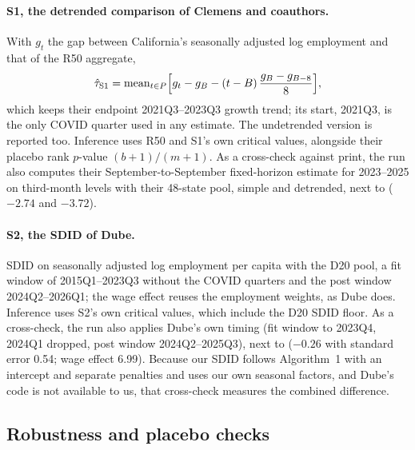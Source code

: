 \paragraph{S1, the detrended comparison of Clemens and coauthors.} With
$g_t$ the gap between California's seasonally adjusted log employment and that of the R50
aggregate,
\begin{equation}
\hat\tau_{\mathrm{S1}} = \operatorname{mean}_{t\in P}\Bigl[g_t - g_B - (t-B)\,\frac{g_B - g_{B-8}}{8}\Bigr],
\end{equation}
which keeps their endpoint 2021Q3--2023Q3 growth trend; its start, 2021Q3, is the only COVID
quarter used in any estimate. The undetrended version is reported too. Inference uses R50 and S1's
own critical values, alongside their placebo rank $p$-value $(b+1)/(m+1)$. As a cross-check against
print, the run also computes their September-to-September fixed-horizon estimate for 2023--2025
on third-month levels with their 48-state pool, simple and detrended, next to
\citet[Table~3, Panel~B]{clemens2026employment} ($-2.74$ and $-3.72$).

\paragraph{S2, the SDID of Dube.} SDID on seasonally adjusted log employment per capita with the D20
pool, a fit window of 2015Q1--2023Q3 without the COVID quarters and the post window 2024Q2--2026Q1;
the wage effect reuses the employment weights, as Dube does. Inference uses S2's own critical
values, which include the D20 SDID floor. As a cross-check, the run also applies Dube's own timing
(fit window to 2023Q4, 2024Q1 dropped, post window 2024Q2--2025Q3), next to
\citet[Table~1, Panel~A]{dube2026labor} ($-0.26$ with standard error 0.54; wage effect 6.99).
Because our SDID follows Algorithm~1 with an intercept and separate penalties and uses our own
seasonal factors, and Dube's code is not available to us, that cross-check measures the combined
difference.

\subsection{Robustness and placebo checks}
\label{sec:robust-plan}

